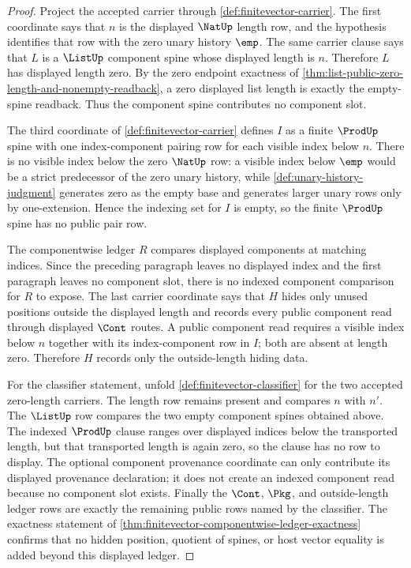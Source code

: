 \begin{proof}
Project the accepted carrier through \autoref{def:finitevector-carrier}. The first coordinate says that $n$ is the displayed $\NatUp$ length row, and the hypothesis identifies that row with the zero unary history $\emp$. The same carrier clause says that $L$ is a $\ListUp$ component spine whose displayed length is $n$. Therefore $L$ has displayed length zero. By the zero endpoint exactness of \autoref{thm:list-public-zero-length-and-nonempty-readback}, a zero displayed list length is exactly the empty-spine readback. Thus the component spine contributes no component slot.

The third coordinate of \autoref{def:finitevector-carrier} defines $I$ as a finite $\ProdUp$ spine with one index-component pairing row for each visible index below $n$. There is no visible index below the zero $\NatUp$ row: a visible index below $\emp$ would be a strict predecessor of the zero unary history, while \autoref{def:unary-history-judgment} generates zero as the empty base and generates larger unary rows only by one-extension. Hence the indexing set for $I$ is empty, so the finite $\ProdUp$ spine has no public pair row.

The componentwise ledger $R$ compares displayed components at matching indices. Since the preceding paragraph leaves no displayed index and the first paragraph leaves no component slot, there is no indexed component comparison for $R$ to expose. The last carrier coordinate says that $H$ hides only unused positions outside the displayed length and records every public component read through displayed $\Cont$ routes. A public component read requires a visible index below $n$ together with its index-component row in $I$; both are absent at length zero. Therefore $H$ records only the outside-length hiding data.

For the classifier statement, unfold \autoref{def:finitevector-classifier} for the two accepted zero-length carriers. The length row remains present and compares $n$ with $n'$. The $\ListUp$ row compares the two empty component spines obtained above. The indexed $\ProdUp$ clause ranges over displayed indices below the transported length, but that transported length is again zero, so the clause has no row to display. The optional component provenance coordinate can only contribute its displayed provenance declaration; it does not create an indexed component read because no component slot exists. Finally the $\Cont$, $\Pkg$, and outside-length ledger rows are exactly the remaining public rows named by the classifier. The exactness statement of \autoref{thm:finitevector-componentwise-ledger-exactness} confirms that no hidden position, quotient of spines, or host vector equality is added beyond this displayed ledger.
\end{proof}


